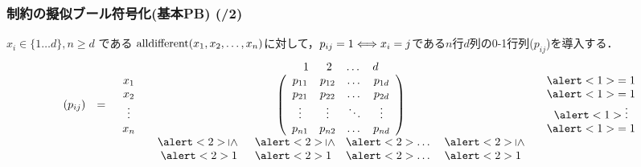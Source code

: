 \begin{frame}
    \frametitle{{\alldiff}制約の擬似ブール符号化(基本PB) (/2)}
    \begin{exampleblock}{}
        $x_i \in \{ 1 \dots d \}, n \geq d$ である $\textrm{alldifferent}(x_1,x_2,\ldots,x_n)$に対して，$p_{ij}=1 \Longleftrightarrow x_i=j$である$n$行$d$列の0-1行列($p_{ij}$)を導入する．
        \begin{displaymath}
            \begin{array}{ccccc}
             & & & \begin{array}{cccc}  1\;\;&2&\;\dots&d \end{array}&\\
                (p_{ij})&=&
                \begin{array}{c}x_1\\ x_2\\ \vdots\\ x_n \end{array}&
                \left(
                    \begin{array}{cccc}
                        p_{11}&p_{12}&\dots&p_{1d}\\
                        p_{21}&p_{22}&\dots&p_{2d}\\
                        \vdots&\vdots&\ddots&\vdots\\
                        p_{n1}&p_{n2}&\dots&p_{nd}
                \end{array}\right)&
                \begin{array}{c} \alert<1>{= 1}\\ \alert<1>{= 1}\\ \alert<1>{\vdots}\\ \alert<1>{= 1} \end{array}\\
                & & & \begin{array}{cccc}  
                \alert<2>{\rotatebox[origin=c]{-90}{$\leq$}}\;\;&
                \alert<2>{\rotatebox[origin=c]{-90}{$\leq$}}&
                \alert<2>{\dots}\;&
                \alert<2>{\rotatebox[origin=c]{-90}{$\leq$}} 
                \end{array}&\\
                & & & \begin{array}{cccc}  \alert<2>{1}\;\;&\alert<2>{1}&\;\alert<2>{\dots}\;&\alert<2>{1} \end{array}&

\end{array}
\end{displaymath}
\end{exampleblock}
\end{frame}
